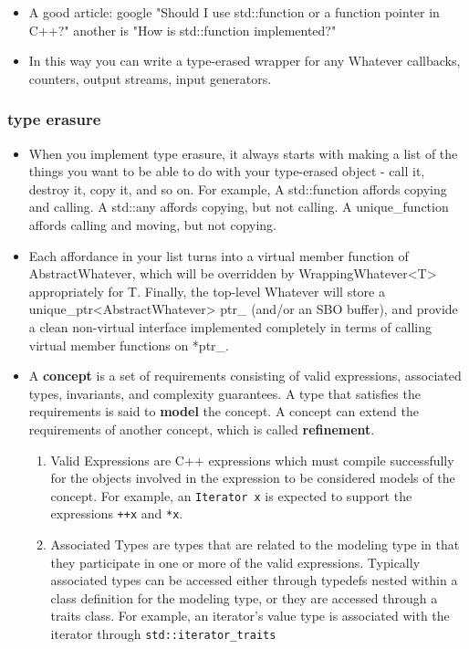 \documentclass[a4paper,11pt,twoside]{book}
\begin{document}
\begin{itemize}
	\item A good article: google "Should I use std::function or a function pointer in C++?" another is "How is std::function implemented?"
	
	
	\item In this way you can write a type-erased wrapper for any Whatever callbacks, counters, output streams, input generators.
	
\end{itemize}

\subsubsection{type erasure}
\begin{itemize}
\item When you implement type erasure, it always starts with making a list of the things you want to be able to do with your type-erased object - call it, destroy it, copy it, and so on. For example, A std::function affords copying and calling. A std::any affords copying, but not calling. A unique\_function affords calling and moving, but not copying.

\item Each affordance in your list turns into a virtual member function of AbstractWhatever, which will be overridden by WrappingWhatever<T> appropriately for T. Finally, the top-level Whatever will store a unique\_ptr<AbstractWhatever> ptr\_ (and/or an SBO buffer), and provide a clean non-virtual interface implemented completely in terms of calling virtual member functions on *ptr\_.

\item A \textbf{concept} is a set of requirements consisting of valid expressions, associated types, invariants, and complexity guarantees. A type that satisfies the requirements is said to \textbf{model} the concept. A concept can extend the requirements of another concept, which is called \textbf{refinement}.
\begin{enumerate}
	\item Valid Expressions are C++ expressions which must compile successfully for the objects involved in the expression to be considered models of the concept. For example, an \texttt{Iterator x} is expected to support the expressions \texttt{++x} and \texttt{*x}.

	\item Associated Types are types that are related to the modeling type in that they participate in one or more of the valid expressions. Typically associated types can be accessed either through typedefs nested within a class definition for the modeling type, or they are accessed through a traits class. For example, an iterator's value type is associated with the iterator through \texttt{std::iterator\_traits}


\end{enumerate}
\end{itemize}
\end{document}
